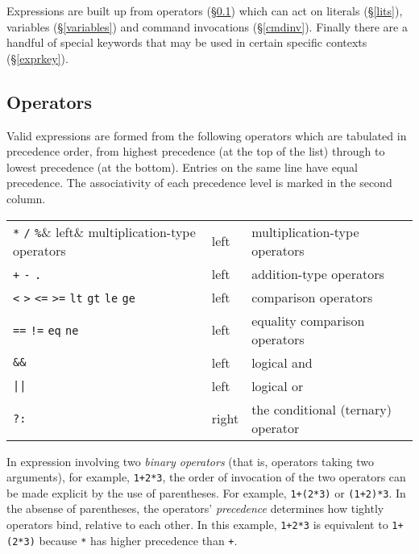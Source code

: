 \documentclass[a4paper,11pt,oneside]{book}
\newcommand{\sref}[1]{\hyperref[#1]{\S\ref{#1}}}
\begin{document}
Expressions are built up from operators (\sref{oper}) which can act 
on literals (\sref{lits}), variables (\sref{variables}) and 
command invocations (\sref{cmdinv}).  Finally there are a handful of 
special keywords that may be used in certain specific contexts 
(\sref{exprkey}).

\subsection{Operators}\label{oper}

Valid expressions are formed from the following operators 
which are tabulated in precedence%
 order, 
from highest precedence (at the top of the list) through to lowest 
precedence (at the bottom).  Entries on the same line have equal precedence.
The associativity%
 of each precedence level 
is marked in the second column.

\begin{tabular}{l@{\quad}l@{\quad}l}
\verb+*+ \verb+/+ \verb+%+& left& multiplication-type operators\\
\verb-+- \verb+-+ \verb+.+& left& addition-type operators\\
\verb+<+ \verb+>+ \verb+<=+ \verb+>=+ \verb+lt+ \verb+gt+ \verb+le+ \verb+ge+&
                            left& comparison operators\\
\verb+==+ \verb+!=+ \verb+eq+ \verb+ne+&
                            left& equality comparison operators\\
\verb+&&+&                  left& logical and\\
\verb+||+&                  left& logical or\\
\verb+?:+&                  right& the conditional (ternary) operator\\
\end{tabular}

In expression involving two \textit{binary operators}
(that is, operators taking two arguments), for example, \verb-1+2*3-, 
the order of invocation of the two operators can be made explicit by the use
of parentheses.  For example, \verb-1+(2*3)- or 
\verb-(1+2)*3-.  In the absense of parentheses, the operators' 
\textit{precedence} determines how tightly operators bind, relative to each 
other.  In this example, \verb-1+2*3- is equivalent to \verb-1+(2*3)- because
\verb+*+ has higher precedence than \verb-+-.
\end{document}
